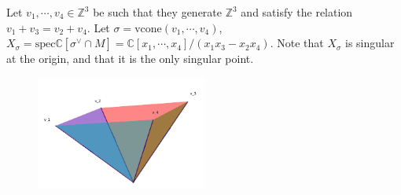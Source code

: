 \documentclass[a4paper,12pt]{amsart}
\newcommand{\ZZ}{\mathbb{Z}}
\newcommand{\CC}{\mathbb{C}}
\begin{document}
\begin{example}
	Let $v_1,\cdots,v_4\in\ZZ^3$ be such that they generate $\ZZ^3$ and satisfy the relation $v_1+v_3=v_2+v_4$. Let $\sigma=\text{vcone}(v_1,\cdots,v_4)$, $X_\sigma=\text{spec}\CC[\sigma^\vee\cap M]=\CC[x_1,\cdots,x_4]/(x_1x_3-x_2x_4)$. Note that $X_\sigma$ is singular at the origin, and that it is the only singular point.
\end{example}

\begin{figure}[h]
	\centering
	\includegraphics[width=0.5\textwidth]{pic/Mar19_fan0}
\end{figure}
\end{document}
